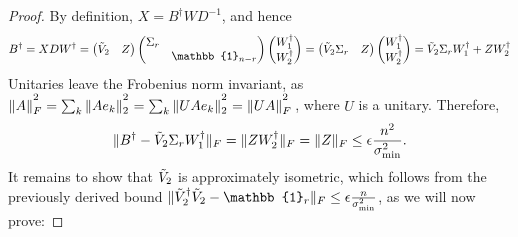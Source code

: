 \begin{proof}
By definition, $X=B^{\dag}WD^{-1}$, and hence
\begin{equation*}
B^{\dag}=XDW^{\dag} = 
\begin{pmatrix}
\Tilde{V}_2 & Z
\end{pmatrix}
\begin{pmatrix}
\Sigma_r &\\
& \mathbb{1}_{n-r}
\end{pmatrix}
\begin{pmatrix}
W_1^{\dag} \\ W_2^{\dag}
\end{pmatrix} = 
\begin{pmatrix}
\Tilde{V}_2 \Sigma_r & Z
\end{pmatrix}
\begin{pmatrix}
W_1^{\dag} \\ W_2^{\dag}
\end{pmatrix} = \Tilde{V}_2\Sigma_r W_1^{\dag} + ZW_2^{\dag}
\end{equation*}
Unitaries leave the Frobenius norm invariant, as $\|A\|_F^{\textstyle ^2}=\sum_k\|Ae_k\|_2^{\textstyle ^2} = \sum_k \|UAe_k\|_2^{\textstyle ^2}=\|UA\|_F^{\textstyle ^2}\thinspace$, where $U$ is a unitary. Therefore,
\begin{equation*}
\|B^{\dag}-\Tilde{V}_2\Sigma_r W_1^{\dag}\|_F=\|ZW_2^{\dag}\|_F=\|Z\|_F\leq\epsilon \frac{n^2}{\sigma_{\text{min}}^2}.
\end{equation*}
It remains to show that $\Tilde{V}_2$ is approximately isometric, which follows from the previously derived bound $\|\Tilde{V}_2^{\dag}\Tilde{V}_2 -\mathbb{1}_r\|_F\leq\epsilon\frac{n}{\sigma_{\text{min}}^2}$, as we will now prove:


\end{proof}
